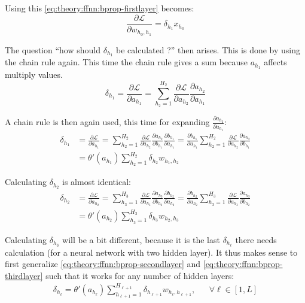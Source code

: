 Using this \eqref{eq:theory:ffnn:bprop-firstlayer} becomes:
\begin{equation}
\frac{\partial \mathcal{L}}{\partial w_{h_0, h_1}} = \delta_{h_1} x_{h_0}
\label{eq:theory:ffnn:bprop-w01}
\end{equation}

The question ``how should $\delta_{h_1}$ be calculated ?'' then arises. This is done by using the chain rule again. This time the chain rule gives a sum because $a_{h_1}$ affects multiply values.
\begin{equation}
\delta_{h_1} = \frac{\partial \mathcal{L}}{\partial a_{h_1}} = \sum_{h_2=1}^{H_2} \frac{\partial \mathcal{L}}{\partial a_{h_2}} \frac{\partial a_{h_2}}{\partial a_{h_1}}
\end{equation}

A chain rule is then again used, this time for expanding $\frac{\partial a_{h_2}}{\partial a_{h_1}}$:
\begin{equation}
\begin{aligned}
\delta_{h_1}
&= \frac{\partial \mathcal{L}}{\partial a_{h_1}}
= \sum_{h_2=1}^{H_2} \frac{\partial \mathcal{L}}{\partial a_{h_2}} \frac{\partial a_{h_2}}{\partial b_{h_1}} \frac{\partial b_{h_1}}{\partial a_{h_1}}
= \frac{\partial b_{h_1}}{\partial a_{h_1}} \sum_{h_2=1}^{H_2} \frac{\partial \mathcal{L}}{\partial a_{h_2}} \frac{\partial a_{h_2}}{\partial b_{h_1}} \\
&= \theta'(a_{h_1}) \sum_{h_2=1}^{H_2} \delta_{h_2} w_{h_1, h_2}
\end{aligned}
\label{eq:theory:ffnn:bprop-secondlayer}
\end{equation}

Calculating $\delta_{h_2}$ is almost identical:
\begin{equation}
\begin{aligned}
\delta_{h_2}
&= \frac{\partial \mathcal{L}}{\partial a_{h_2}}
= \sum_{h_3=1}^{H_3} \frac{\partial \mathcal{L}}{\partial a_{h_3}} \frac{\partial a_{h_3}}{\partial b_{h_2}} \frac{\partial b_{h_2}}{\partial a_{h_2}}
= \frac{\partial b_{h_2}}{\partial a_{h_2}} \sum_{h_3=1}^{H_3} \frac{\partial \mathcal{L}}{\partial a_{h_3}} \frac{\partial a_{h_3}}{\partial b_{h_2}} \\
&= \theta'(a_{h_2}) \sum_{h_3=1}^{H_3} \delta_{h_3} w_{h_2, h_3}
\end{aligned}
\label{eq:theory:ffnn:bprop-thirdlayer}
\end{equation}

Calculating $\delta_{h_3}$ will be a bit different, because it is the last $\delta_{h_\ell}$ there needs calculation (for a neural network with two hidden layer). It thus makes sense to first generalize \eqref{eq:theory:ffnn:bprop-secondlayer} and \eqref{eq:theory:ffnn:bprop-thirdlayer} such that it works for any number of hidden layers:
\begin{equation}
\begin{aligned}
\delta_{h_\ell} = \theta'(a_{h_\ell}) \sum_{h_{\ell+1}=1}^{H_{\ell+1}} \delta_{h_{\ell+1}} w_{h_\ell, h_{\ell+1}}, && \forall \ell \in [1, L]
\end{aligned}
\label{eq:theory:ffnn:bprop-genalized}
\end{equation}

